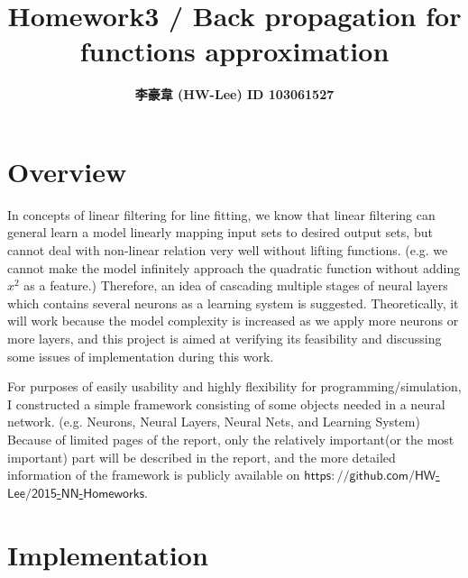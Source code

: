 \documentclass[12pt]{article}
\title{\textbf{Homework3 / Back propagation for functions approximation}}
\author{\textbf{李豪韋 (HW-Lee) ID 103061527}}
\date{}
\begin{document}
\vspace*{-60pt}
    {\let\newpage\relax\maketitle}

\section*{Overview}
\vspace{-20pt}
\noindent\makebox[\linewidth]{\rule{\textwidth}{0.4pt}}
\vspace{5pt}

In concepts of linear filtering for line fitting, we know that linear filtering can general learn a model linearly mapping input sets to desired output sets, but cannot deal with non-linear relation very well without lifting functions. (e.g. we cannot make the model infinitely approach the quadratic function without adding $x^2$ as a feature.) Therefore, an idea of cascading multiple stages of neural layers which contains several neurons as a learning system is suggested. Theoretically, it will work because the model complexity is increased as we apply more neurons or more layers, and this project is aimed at verifying its feasibility and discussing some issues of implementation during this work.

For purposes of easily usability and highly flexibility for programming/simulation, I constructed a simple framework consisting of some objects needed in a neural network. (e.g. Neurons, Neural Layers, Neural Nets, and Learning System) Because of limited pages of the report, only the relatively important(or the most important) part will be described in the report, and the more detailed information of the framework is publicly available on \href{https://github.com/HW-Lee/2015-NN-Homeworks}{$\mathsf{https://github.com/HW}$-$\mathsf{Lee/2015}$-$\mathsf{NN}$-$\mathsf{Homeworks}$}.

\section*{Implementation}
\vspace{-20pt}
\noindent\makebox[\linewidth]{\rule{\textwidth}{0.4pt}}
\end{document}
